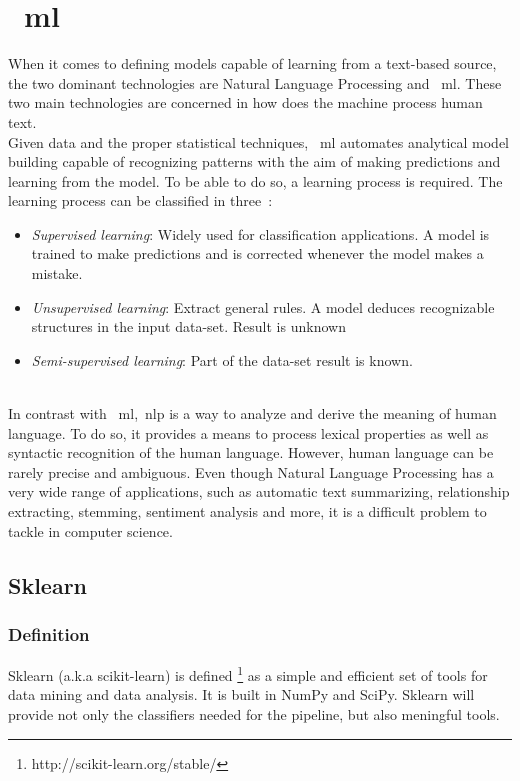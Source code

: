 \section{~\acl{ml}}
When it comes to defining models capable of learning from a text-based source, the two dominant technologies are Natural Language Processing and ~\ac{ml}. These two main technologies are concerned in how does the machine process human text. \\
Given data and the proper statistical techniques, ~\ac{ml} automates analytical model building capable of recognizing patterns with the aim of making predictions and learning from the model. To be able to do so, a learning process is required. The learning process can be classified in three~\cite{mltypes}:
\begin{itemize}
    \item \textit{Supervised learning}: Widely used for classification applications. A model is trained to make predictions and is corrected whenever the model makes a mistake.
    \item \textit{Unsupervised learning}: Extract general rules. A model deduces recognizable structures in the input data-set. Result is unknown  
    \item \textit{Semi-supervised learning}: Part of the data-set result is known. 
\end{itemize} 
\\
In contrast with ~\ac{ml},~\ac{nlp} is a way to analyze and derive the meaning of human language. To do so, it provides a means to process lexical properties as well as syntactic recognition of the human language. However, human language can be rarely precise and ambiguous. Even though Natural Language Processing has a very wide range of applications, such as automatic text summarizing, relationship extracting, stemming, sentiment analysis and more, it is a difficult problem to tackle in computer science.

\subsection{Sklearn}
\subsubsection{Definition}
Sklearn (a.k.a scikit-learn) is defined \footnote{http://scikit-learn.org/stable/} as a simple and efficient set of tools for data mining and data analysis. It is built in NumPy and SciPy. Sklearn will provide not only the classifiers needed for the pipeline, but also meningful tools.
